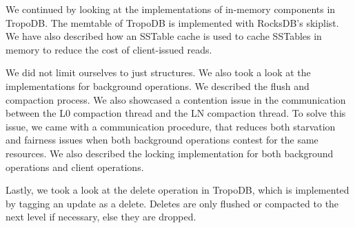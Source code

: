 We continued by looking at the implementations of in-memory components in TropoDB. The memtable of TropoDB is implemented with RocksDB's skiplist. We have also described how an SSTable cache is used to cache SSTables in memory to reduce the cost of client-issued reads.

We did not limit ourselves to just structures. We also took a look at the implementations for background operations. We described the flush and compaction process. We also showcased a contention issue in the communication between the L0 compaction thread and the LN compaction thread. To solve this issue, we came with a communication procedure, that reduces both starvation and fairness issues when both background operations contest for the same resources. We also described the locking implementation for both background operations and client operations.

Lastly, we took a look at the delete operation in TropoDB, which is implemented by tagging an update as a delete. Deletes are only flushed or compacted to the next level if necessary, else they are dropped.
